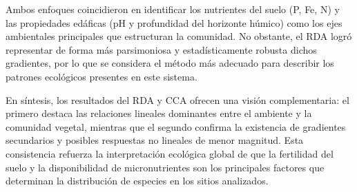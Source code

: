 \documentclass[
  spanish,
  11pt,
  a4paper,
  DIV=11,
  numbers=noendperiod]{scrartcl}
\begin{document}
Ambos enfoques coincidieron en identificar los nutrientes del suelo (P,
Fe, N) y las propiedades edáficas (pH y profundidad del horizonte
húmico) como los ejes ambientales principales que estructuran la
comunidad. No obstante, el RDA logró representar de forma más
parsimoniosa y estadísticamente robusta dichos gradientes, por lo que se
considera el método más adecuado para describir los patrones ecológicos
presentes en este sistema.

En síntesis, los resultados del RDA y CCA ofrecen una visión
complementaria: el primero destaca las relaciones lineales dominantes
entre el ambiente y la comunidad vegetal, mientras que el segundo
confirma la existencia de gradientes secundarios y posibles respuestas
no lineales de menor magnitud. Esta consistencia refuerza la
interpretación ecológica global de que la fertilidad del suelo y la
disponibilidad de micronutrientes son los principales factores que
determinan la distribución de especies en los sitios analizados.
\end{document}
